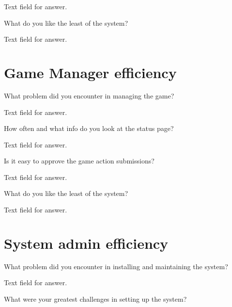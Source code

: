 Text field for answer.

\begin{question}
    \item What do you like the least of the system?
\end{question}

Text field for answer.

\section{Game Manager efficiency}

\begin{question}
	\item What problem did you encounter in managing the game?
\end{question}

Text field for answer.

\begin{question}
	\item How often and what info do you look at the status page?
\end{question}

Text field for answer.

\begin{question}
	\item Is it easy to approve the game action submissions?
\end{question}

Text field for answer.

\begin{question}
	\item What do you like the least of the system?
\end{question}

Text field for answer.

\section{System admin efficiency}

\begin{question}
	\item What problem did you encounter in installing and maintaining the system?
\end{question}

Text field for answer.

\begin{question}
	\item What were your greatest challenges in setting up the system?
\end{question}


